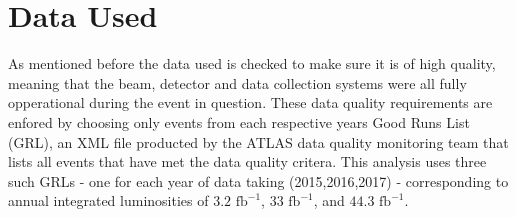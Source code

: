 \section{Data Used} \label{sec:data:data}

As mentioned before the data used is checked to make sure it is of high
quality, meaning that the beam, detector and data collection systems were all
fully opperational during the event in question. These data quality
requirements are enfored by choosing only events from each respective years
Good Runs List (GRL), an XML file producted by the ATLAS data quality
monitoring team that lists all events that have met the data quality critera.
This analysis uses three such GRLs - one for each year of data taking
(2015,2016,2017) - corresponding to annual integrated luminosities of $3.2
\text{ fb}^{-1}$, $33 \text{ fb}^{-1}$, and $44.3 \text{ fb}^{-1}$.
